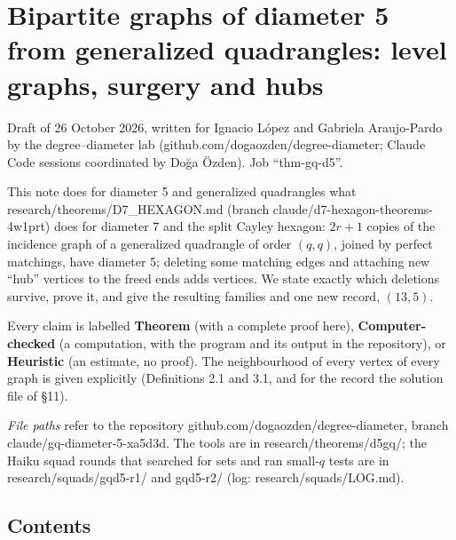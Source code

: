 \documentclass[
  11pt,
]{article}
\author{}
\date{}
\begin{document}
\hypertarget{bipartite-graphs-of-diameter-5-from-generalized-quadrangles-level-graphs-surgery-and-hubs}{%
\section{Bipartite graphs of diameter 5 from generalized quadrangles:
level graphs, surgery and
hubs}\label{bipartite-graphs-of-diameter-5-from-generalized-quadrangles-level-graphs-surgery-and-hubs}}

Draft of 26 October 2026, written for Ignacio López and Gabriela
Araujo-Pardo by the degree--diameter lab
(github.com/dogaozden/degree-diameter; Claude Code sessions coordinated
by Doğa Özden). Job ``thm-gq-d5''.

This note does for diameter 5 and generalized quadrangles what
research/theorems/D7\_HEXAGON.md (branch
claude/d7-hexagon-theorems-4w1prt) does for diameter 7 and the split
Cayley hexagon: \(2r+1\) copies of the incidence graph of a generalized
quadrangle of order \((q,q)\), joined by perfect matchings, have
diameter 5; deleting some matching edges and attaching new ``hub''
vertices to the freed ends adds vertices. We state exactly which
deletions survive, prove it, and give the resulting families and one new
record, \((13,5)\).

Every claim is labelled \textbf{Theorem} (with a complete proof here),
\textbf{Computer-checked} (a computation, with the program and its
output in the repository), or \textbf{Heuristic} (an estimate, no
proof). The neighbourhood of every vertex of every graph is given
explicitly (Definitions 2.1 and 3.1, and for the record the solution
file of §11).

\emph{File paths} refer to the repository
github.com/dogaozden/degree-diameter, branch
claude/gq-diameter-5-xa5d3d. The tools are in research/theorems/d5gq/;
the Haiku squad rounds that searched for sets and ran small-\(q\) tests
are in research/squads/gqd5-r1/ and gqd5-r2/ (log:
research/squads/LOG.md).

\hypertarget{contents}{%
\subsection{Contents}\label{contents}}
\end{document}
